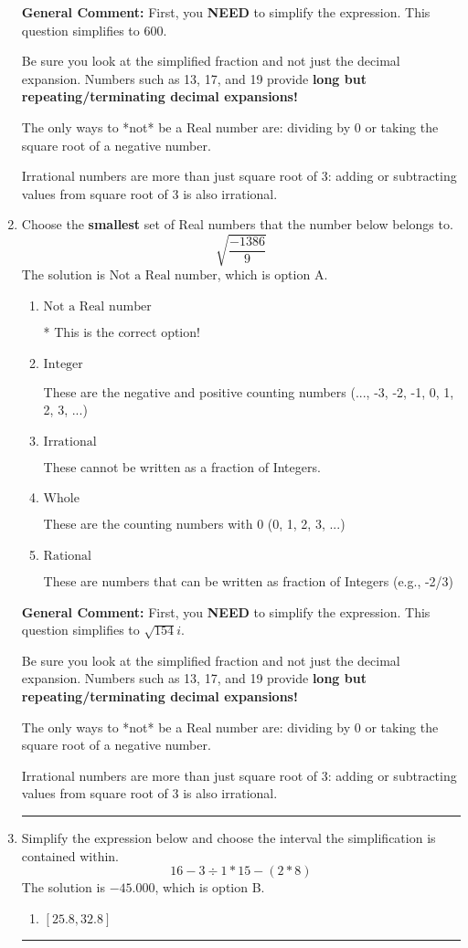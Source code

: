 \documentclass{extbook}[14pt]
\newcommand{\litem}[1]{\item #1

\rule{\textwidth}{0.4pt}}
\begin{document}
\begin{enumerate}
{\textbf{General Comment:} First, you \textbf{NEED} to simplify the expression. This question simplifies to $600$. 
 
 Be sure you look at the simplified fraction and not just the decimal expansion. Numbers such as 13, 17, and 19 provide \textbf{long but repeating/terminating decimal expansions!} 
 
 The only ways to *not* be a Real number are: dividing by 0 or taking the square root of a negative number. 
 
 Irrational numbers are more than just square root of 3: adding or subtracting values from square root of 3 is also irrational.
}
\litem{
Choose the \textbf{smallest} set of Real numbers that the number below belongs to.
\[ \sqrt{\frac{-1386}{9}} \]The solution is \( \text{Not a Real number} \), which is option A.\begin{enumerate}[label=\Alph*.]
\item \( \text{Not a Real number} \)

* This is the correct option!
\item \( \text{Integer} \)

These are the negative and positive counting numbers (..., -3, -2, -1, 0, 1, 2, 3, ...)
\item \( \text{Irrational} \)

These cannot be written as a fraction of Integers.
\item \( \text{Whole} \)

These are the counting numbers with 0 (0, 1, 2, 3, ...)
\item \( \text{Rational} \)

These are numbers that can be written as fraction of Integers (e.g., -2/3)
\end{enumerate}

\textbf{General Comment:} First, you \textbf{NEED} to simplify the expression. This question simplifies to $\sqrt{154} i$. 
 
 Be sure you look at the simplified fraction and not just the decimal expansion. Numbers such as 13, 17, and 19 provide \textbf{long but repeating/terminating decimal expansions!} 
 
 The only ways to *not* be a Real number are: dividing by 0 or taking the square root of a negative number. 
 
 Irrational numbers are more than just square root of 3: adding or subtracting values from square root of 3 is also irrational.
}
\litem{
Simplify the expression below and choose the interval the simplification is contained within.
\[ 16 - 3 \div 1 * 15 - (2 * 8) \]The solution is \( -45.000 \), which is option B.\begin{enumerate}[label=\Alph*.]
\item \( [25.8, 32.8] \)


\end{enumerate}}
\end{enumerate}
\end{document}
